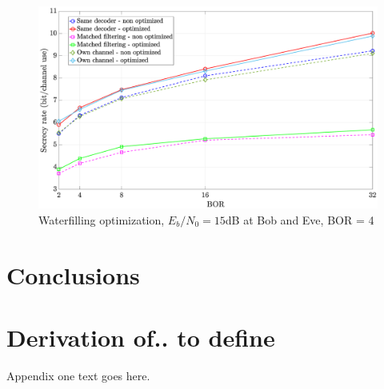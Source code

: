\documentclass[journal,comsoc]{IEEEtran}
\let\MYoriglatexcaption\caption
\renewcommand{\caption}[2][\relax]{\MYoriglatexcaption[#2]{#2}}
\begin{document}
\begin{figure}[h!t]
	\centering
	\includegraphics[width=1\linewidth]{graphs/SISO_no_corr_waterfilling.eps}
	\caption{Waterfilling optimization, $E_b/N_0 = 15$dB at Bob and Eve, BOR = 4}
	\label{fig_waterfilling_opt}
\end{figure}




\section{Conclusions}
















\appendices
\section{Derivation of.. to define}
Appendix one text goes here.
\end{document}
